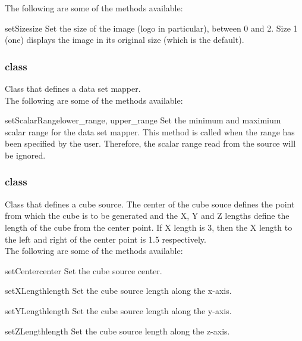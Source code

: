 The following are some of the methods available:

\begin{methoddesc}[ImageReslice]{setSize}{size}
Set the size of the image (logo in particular), between 0 and 2. Size 1 (one) 
displays the image in its original size (which is the default).
\end{methoddesc}

\subsubsection{\DataSetMapper class}
Class that defines a data set mapper. \\

The following are some of the methods available:

\begin{methoddesc}[DataSetMapper]{setScalarRange}{lower_range, upper_range}
Set the minimum and maximium scalar range for the data set mapper. This
method is called when the range has been specified by the user.
Therefore, the scalar range read from the source will be ignored.
\end{methoddesc}

\subsubsection{\CubeSource class}
Class that defines a cube source. The center of the cube souce defines
the point from which the cube is to be generated and the X, Y
and Z lengths define the length of the cube from the center point. If
X length is 3, then the X length to the left and right of the center
point is 1.5 respectively.\\ 

The following are some of the methods available:

\begin{methoddesc}[CubeSource]{setCenter}{center}
Set the cube source center.
\end{methoddesc}

\begin{methoddesc}[CubeSource]{setXLength}{length}
Set the cube source length along the x-axis.
\end{methoddesc}

\begin{methoddesc}[CubeSource]{setYLength}{length}
Set the cube source length along the y-axis.
\end{methoddesc}

\begin{methoddesc}[CubeSource]{setZLength}{length}
Set the cube source length along the z-axis.
\end{methoddesc}

